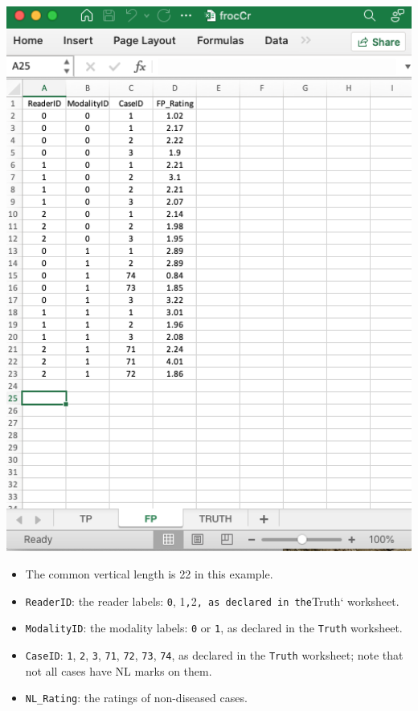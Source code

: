 \documentclass[
]{book}
\providecommand{\tightlist}{%
  \setlength{\itemsep}{0pt}\setlength{\parskip}{0pt}}
\begin{document}
\includegraphics[width=1\textwidth,height=\textheight]{images/software-details/frocCrFp.png}

\begin{itemize}
\tightlist
\item
  The common vertical length is 22 in this example.
\item
  \texttt{ReaderID}: the reader labels: \texttt{0}, 1\texttt{,}2\texttt{,\ as\ declared\ in\ the}Truth` worksheet.
\item
  \texttt{ModalityID}: the modality labels: \texttt{0} or \texttt{1}, as declared in the \texttt{Truth} worksheet.
\item
  \texttt{CaseID}: \texttt{1}, \texttt{2}, \texttt{3}, \texttt{71}, \texttt{72}, \texttt{73}, \texttt{74}, as declared in the \texttt{Truth} worksheet; note that not all cases have NL marks on them.\\
\item
  \texttt{NL\_Rating}: the ratings of non-diseased cases.
\end{itemize}
\end{document}
